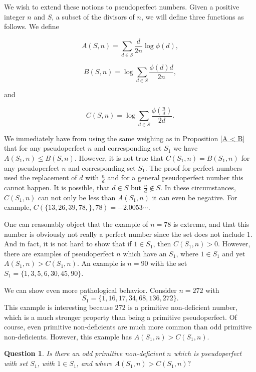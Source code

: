 \documentclass{article}
\newtheorem{question}[theorem]{Question}
\begin{document}
We wish to extend these notions to pseudoperfect numbers.   Given a positive integer $n$ and $S$, a subset of the divisors of $n$, we will define three functions as follows. We define

\begin{equation}A(S,n) = \sum_{d \in S } \frac{d}{2n} \log \phi(d), \label{A def}\end{equation}

\begin{equation} B(S,n) =  \log \sum_{d \in S} \frac{\phi(d)d}{2n}, \label{B def}
\end{equation}

and 

\begin{equation} C(S,n)=  \log \sum_{d \in S} \frac{\phi(\frac{n}{d})}{2d} \label{C def}.    
\end{equation}

We immediately have from using the same weighing as in Proposition \ref{A < B} that for any pseudoperfect $n$ and corresponding set $S_1$ we have $A(S_1,n) \leq B(S,n)$. However, it is not true that $C(S_1,n) = B(S_1,n)$ for any pseudoperfect $n$ and corresponding set $S_1$. The proof for perfect numbers used the replacement of $d$ with $\frac{n}{d}$ and for a general pseudoperfect number this cannot happen. It is possible, that $d \in S$ but $\frac{n}{d} \not \in S$. In these circumstances, $C(S_1,n)$ can not only be less than $A(S_1,n)$ it can even be negative. For example,  $C(\{13, 26,39, 78,\},78) =   -2.0053 \cdots$. 

One can reasonably object that the example of $n=78$ is extreme, and that this number is obviously not really a perfect number since the set does not include 1. And in fact, it is not hard to show that if $1 \in S_1$, then $C(S_1,n) > 0$. However, there are examples of pseudoperfect $n$ which have an $S_1$, where $1 \in S_1$ and yet $A(S_1,n) > C(S_1,n)$.  An example is $n=90$ with the set $S_1=\{1, 3, 5, 6, 30, 45, 90\}.$ 

We can show even more pathological behavior. Consider $n=272$ with $$S_1= \{1, 16,17, 34, 68, 136, 272\}.$$  This example is interesting because $272$ is a primitive non-deficient number, which is a much stronger property than being a primitive pseudoperfect. Of course, even primitive non-deficients are much more common than odd primitive non-deficients. However, this example has $A(S_1,n) > C(S_1,n)$.

 \begin{question} Is there an odd primitive non-deficient $n$ which is pseudoperfect with set $S_1$, with $1 \in S_1$, and where $A(S_1,n) > C(S_1,n)?$     
 \end{question}
\end{document}
